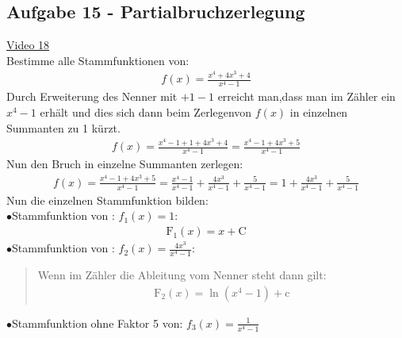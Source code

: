\subsection{Aufgabe 15 - Partialbruchzerlegung}
\href{https://youtu.be/H3AxdhKnQPc}{Video 18}\\
Bestimme alle Stammfunktionen von:\\
\begin{align*}
f(x)=\frac{x^4+4x^3+4}{x^4-1}
\end{align*}
Durch Erweiterung des Nenner mit $ +1-1 $ erreicht man,dass man im Zähler ein $ x^4-1 $ erhält und dies sich dann beim Zerlegenvon $ f(x) $ in einzelnen Summanten zu 1 kürzt.\\
\begin{align*}
f(x)=\frac{x^4-1+1+4x^3+4}{x^4-1}=\frac{x^4-1+4x^3+5}{x^4-1}
\end{align*}
Nun den Bruch in einzelne Summanten zerlegen:\\
\begin{align*}
f(x)=\frac{x^4-1+4x^3+5}{x^4-1}=\frac{x^4-1}{x^4-1}+\frac{4x^3}{x^4-1}+\frac{5}{x^4-1}=1+\frac{4x^3}{x^4-1}+\frac{5}{x^4-1}
\end{align*}
Nun die einzelnen Stammfunktion bilden:\\
$ \bullet $\;\;Stammfunktion von : $f_1(x) =1 $:\\
\begin{align*}
\mathrm{F}_1(x)=x+\mathrm{C}
\end{align*}
$ \bullet $\;\;Stammfunktion von : $f_2(x)=\frac{4x^3}{x^4-1}  $:\\
\begin{quote}
	Wenn im Zähler die Ableitung vom Nenner steht dann gilt:\\
	\begin{align*}
	\mathrm{F}_2(x)=\ln(x^4-1)+\mathrm{c}
	\end{align*}
\end{quote}
$ \bullet $\;\;Stammfunktion ohne Faktor 5 von: $f_3(x)=\frac{1}{x^4-1}   $\\


